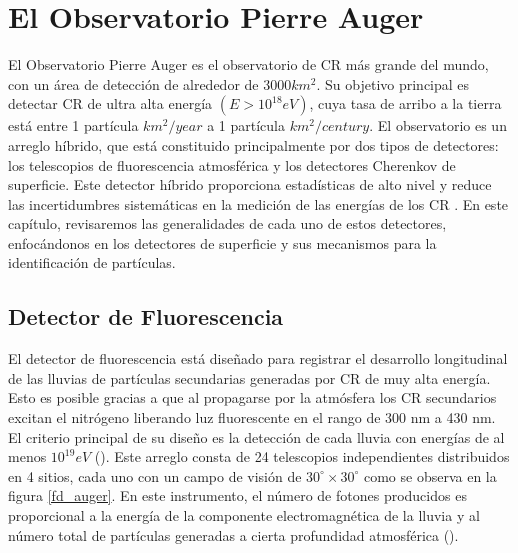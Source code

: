 \newpage
\newpage

\chapter{El Observatorio Pierre Auger}

El Observatorio Pierre Auger es el observatorio de CR más grande del mundo, con un área de detección de alrededor de $3000 km^{2}$. Su objetivo principal es detectar CR de ultra alta energía $(E > 10^{18} eV)$, cuya tasa de arribo a la tierra está entre 1 partícula $km^{2}/year$ a 1 partícula $km^{2}/century$. El observatorio es un arreglo híbrido, que está constituido principalmente por dos tipos de detectores: los telescopios de fluorescencia atmosférica y los detectores Cherenkov de superficie. Este detector híbrido proporciona estadísticas de alto nivel y reduce las incertidumbres sistemáticas en la medición de las energías de los CR \cite{allekotte_2008}. En este capítulo, revisaremos las generalidades de cada uno de estos detectores, enfocándonos en los detectores de superficie y sus mecanismos para la identificación de partículas.

\section{Detector de Fluorescencia}
El detector de fluorescencia está diseñado para registrar el desarrollo longitudinal de las lluvias de partículas secundarias generadas por CR de muy alta energía. Esto es posible gracias a que al propagarse por la atmósfera los CR secundarios excitan el nitrógeno liberando luz fluorescente en el rango de 300 nm a 430 nm. El criterio principal de su diseño es la detección de cada lluvia con energías de al menos $10^{19}eV$ (\cite{FD_auger}). Este arreglo consta de 24 telescopios independientes distribuidos en 4 sitios, cada uno con un campo de visión de $30^{\circ} \times 30^{\circ}$  como se observa en la figura \ref{fd_auger}. En este instrumento, el número de fotones producidos es proporcional a la energía de la componente electromagnética de la lluvia y al número total de partículas generadas a cierta profundidad atmosférica (\cite{FD_auger}).

